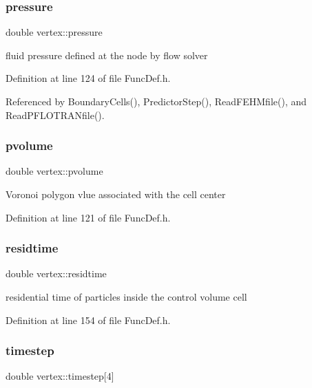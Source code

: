 \subsubsection{\texorpdfstring{pressure}{pressure}}
{\footnotesize\ttfamily double vertex\+::pressure}

fluid pressure defined at the node by flow solver 

Definition at line 124 of file Func\+Def.\+h.



Referenced by Boundary\+Cells(), Predictor\+Step(), Read\+F\+E\+H\+Mfile(), and Read\+P\+F\+L\+O\+T\+R\+A\+Nfile().

\mbox{\label{structvertex_a7cf1594124712ff00a9e4d00926f1010}} 
\subsubsection{\texorpdfstring{pvolume}{pvolume}}
{\footnotesize\ttfamily double vertex\+::pvolume}

Voronoi polygon vlue associated with the cell center 

Definition at line 121 of file Func\+Def.\+h.

\mbox{\label{structvertex_a6ee9434e764f4105136cb10a8c5be642}} 
\subsubsection{\texorpdfstring{residtime}{residtime}}
{\footnotesize\ttfamily double vertex\+::residtime}

residential time of particles inside the control volume cell 

Definition at line 154 of file Func\+Def.\+h.

\mbox{\label{structvertex_a5e4c0ee67478edf757b52b50859dd25e}} 
\subsubsection{\texorpdfstring{timestep}{timestep}}
{\footnotesize\ttfamily double vertex\+::timestep\mbox{[}4\mbox{]}}

